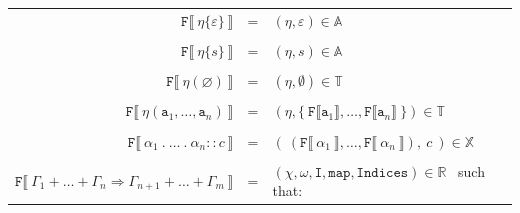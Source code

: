 \documentclass[12pt]{fithesis2}
\begin{document}
\begin{center}
\begin{tabular}{ r c l}
$\mathtt{F} \llbracket ~\eta\{\varepsilon\}~ \rrbracket$ & = & $(\eta, \varepsilon) \in \mathds{A}$\\
 & & \\
$\mathtt{F} \llbracket ~\eta\{s\}~ \rrbracket$ & = & $(\eta, s) \in \mathds{A}$\\
 & & \\
$\mathtt{F} \llbracket ~\eta(\varnothing)~ \rrbracket$ & = & $(\eta, \emptyset) \in \mathds{T}$\\
 & & \\
$\mathtt{F} \llbracket ~\eta(\mathtt{a}_1, \ldots, \mathtt{a}_n)~ \rrbracket$ & = &
$(\eta, \{~ \mathtt{F} \llbracket \mathtt{a}_1 \rrbracket, \ldots, \mathtt{F} \llbracket \mathtt{a}_n \rrbracket ~\}) \in \mathds{T}$\\
 & & \\
$\mathtt{F} \llbracket ~\alpha_1~.~\ldots~.~\alpha_n :: c~ \rrbracket$ & = &
$(~(\mathtt{F} \llbracket ~\alpha_1~ \rrbracket, \ldots, \mathtt{F} \llbracket ~\alpha_n~ \rrbracket), ~c~) \in \mathds{X}$\\
 & & \\
$\mathtt{F} \llbracket ~\Gamma_1 + \ldots + \Gamma_n \Rightarrow \Gamma_{n+1} + \ldots + \Gamma_m~ \rrbracket$ & = &
$(\chi, \omega, \mathtt{I}, \mathtt{map}, \mathtt{Indices}) \in \mathds{R}$~ such that:\\
\end{tabular}
\end{center}
\end{document}
